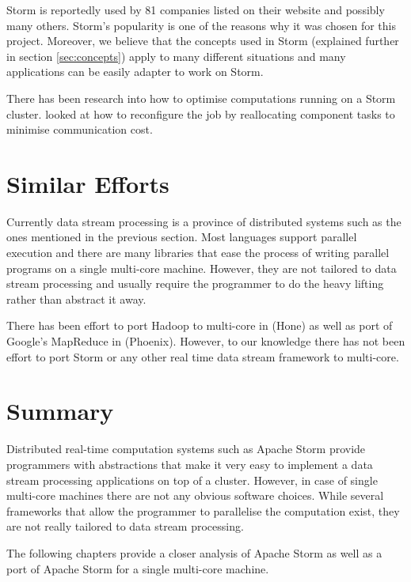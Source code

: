 \documentclass[bsc,logo,frontabs,twoside,singlespacing,normalheadings,parskip]{infthesis}\usepackage[]{graphicx}\usepackage[]{color}
\begin{document}
Storm is reportedly used by 81 companies listed on their website \cite{https://storm.apache.org/documentation/Powered-By.html} and possibly many others. Storm's popularity is one of the reasons why it was chosen for this project. Moreover, we believe that the concepts used in Storm (explained further in section \ref{sec:concepts}) apply to many different situations and many applications can be easily adapter to work on Storm.

There has been research into how to optimise computations running on a Storm cluster. \cite{Chatzistergiou:2014:FHN:2661829.2661882} looked at how to reconfigure the job by reallocating component tasks to minimise communication cost. 

\section{Similar Efforts}
\label{sec:similar_efforts}

Currently data stream processing is a province of distributed systems such as the ones mentioned in the previous section. Most languages support parallel execution and there are many libraries that ease the process of writing parallel programs on a single multi-core machine. However, they are not tailored to data stream processing and usually require the programmer to do the heavy lifting rather than abstract it away.

There has been effort to port Hadoop to multi-core in \citep{Kumar:2013:HSD:2536274.2536314} (Hone) as well as port of Google's MapReduce in \citep{ranger2007evaluating} (Phoenix). However, to our knowledge there has not been effort to port Storm or any other real time data stream framework to multi-core.

\section{Summary}

Distributed real-time computation systems such as Apache Storm provide programmers with abstractions that make it very easy to implement a data stream processing applications on top of  a cluster. However, in case of single multi-core machines there are not any obvious software choices. While several frameworks that allow the programmer to parallelise the computation exist, they are not really tailored to data stream processing.

The following chapters provide a closer analysis of Apache Storm as well as a port of Apache Storm for a single multi-core machine.
\clearpage{}
\end{document}
